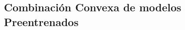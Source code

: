 \documentclass[aspectratio=43]{beamer}
\newcommand{\upper}[1]{\expandafter\MakeUppercase\expandafter{#1}}
\newcommand{\mymat}[1]{\upper{#1}}
\newcommand{\myvec}[1]{\bm{#1}}
\newcommand{\fv}[1]{\myvec{#1}}
\newcommand{\fm}[1]{\mymat{#1}}
\newcommand{\nsamples}{n}
\newcommand{\ntasks}{T}
\begin{document}
  




  


\subsection{Combinación Convexa de modelos Preentrenados}
\end{document}
